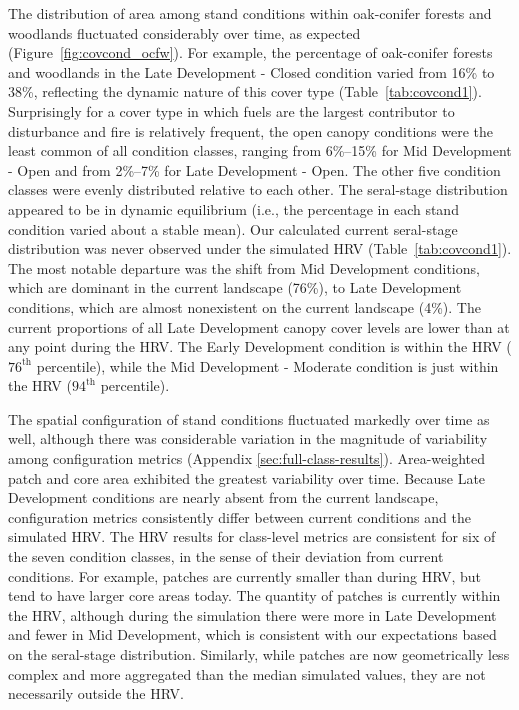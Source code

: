 The distribution of area among stand conditions within oak-conifer forests and woodlands fluctuated considerably over time, as expected (Figure~\ref{fig:covcond_ocfw}). For example, the percentage of oak-conifer forests and woodlands in the Late Development - Closed condition varied from 16\% to 38\%, reflecting the dynamic nature of this cover type (Table~\ref{tab:covcond1}). Surprisingly for a cover type in which fuels are the largest contributor to disturbance and fire is relatively frequent, the open canopy conditions were the least common of all condition classes, ranging from 6\%--15\% for Mid Development - Open and from 2\%--7\% for Late Development - Open. The other five condition classes were evenly distributed relative to each other. %
%
The seral-stage distribution appeared to be in dynamic equilibrium (i.e., the percentage in each stand condition varied about a stable mean). Our calculated current seral-stage distribution was never observed under the simulated HRV (Table~\ref{tab:covcond1}). The most notable departure was the shift from Mid Development conditions, which are dominant in the current landscape (76\%), to Late Development conditions, which are almost nonexistent on the current landscape (4\%). The current proportions of all Late Development canopy cover levels are lower than at any point during the HRV.  The Early Development condition is within the HRV ($76^{\text{th}}$ percentile), while the Mid Development - Moderate condition is just within the HRV ($94^{\text{th}}$ percentile).

The spatial configuration of stand conditions fluctuated markedly over time as well, although there was considerable variation in the magnitude of variability among configuration metrics (Appendix \ref{sec:full-class-results}). Area-weighted patch and core area exhibited the greatest variability over time. Because Late Development conditions are nearly absent from the current landscape, configuration metrics consistently differ between current conditions and the simulated HRV. The HRV results for class-level metrics are consistent for six of the seven condition classes, in the sense of their deviation from current conditions. For example, patches are currently smaller than during HRV, but tend to have larger core areas today. The quantity of patches is currently within the HRV, although during the simulation there were more in Late Development and fewer in Mid Development, which is consistent with our expectations based on the seral-stage distribution. Similarly, while patches are now geometrically less complex and more aggregated than the median simulated values, they are not necessarily outside the HRV.


